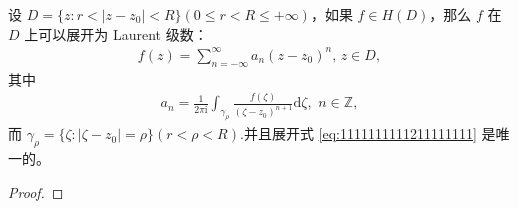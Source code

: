 \documentclass[../../main.tex]{subfiles}%
\begin{document}
\begin{theorem}\label{theorem:定理5.1.2}
设 \( D = \{ z: r < |z - z_0| < R \} (0\leqslant r<R\leqslant +\infty)\)，如果 \( f \in H(D) \)，那么 \( f \) 在 \( D \) 上可以展开为 Laurent 级数：
\begin{align}
f(z) = \sum_{n = -\infty}^{\infty} a_n (z - z_0)^n, \, z \in D, \label{eq:1111111111211111111}
\end{align}
其中
\begin{align*}
a_n = \frac{1}{2\pi \mathrm{i}} \int_{\gamma_{\rho}} \frac{f(\zeta)}{(\zeta - z_0)^{n + 1}} \mathrm{d}\zeta,\,\,n\in \mathbb{Z},
\end{align*}
而 \( \gamma_{\rho} = \{ \zeta: |\zeta - z_0| = \rho \} \)\(( r < \rho < R) \).并且展开式 \eqref{eq:1111111111211111111} 是唯一的。
\end{theorem}
\begin{proof}


\end{proof}
\end{document}
